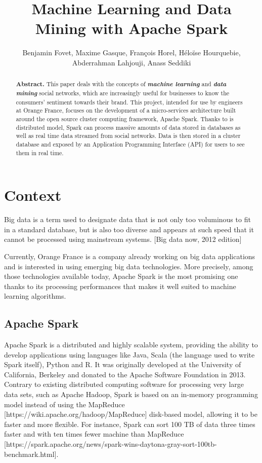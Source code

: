 \documentclass[11pt]{article}
\title{\textbf{Machine Learning and Data Mining with Apache Spark}}
\author{Benjamin Fovet, Maxime Gasque, François Horel, Héloïse Hourquebie, Abderrahman Lahjouji, Anass Seddiki}
\affil{\texttt{\{bfovet, mgasque, fhorel, hhourquebie, alahjouji, aseddiki\} @enseirb-matmeca.fr}}
\date{}
\begin{document}
\maketitle

\begin{abstract}
\textbf{Abstract.} This paper deals with the concepts of \textbf{\textit{machine learning}} and \textbf{\textit{data mining}} social networks, which are increasingly useful for businesses to know the consumers' sentiment towards their brand. This project, intended for use by engineers at Orange France, focuses on the development of a micro-services architecture built around the open source cluster computing framework, Apache Spark. Thanks to is distributed model, Spark can process massive amounts of data stored in databases as well as real time data streamed from social networks. Data is then stored in a cluster database and exposed by an Application Programming Interface (API) for users to see them in real time.
\end{abstract}

\section{Context}
Big data is a term used to designate data that is not only too voluminous to fit in a standard database, but is also too diverse and appears at such speed that it cannot be processed using mainstream systems. [Big data now, 2012 edition]
\vskip 9pt

Currently, Orange France is a company already working on big data applications and is interested in using emerging big data technologies. More precisely, among those technologies available today, Apache Spark is the most promising one thanks to its processing performances that makes it well suited to machine learning algorithms.

\subsection{Apache Spark}
\label{apache spark}
Apache Spark is a distributed and highly scalable system, providing the ability to develop applications using languages like Java, Scala (the language used to write Spark itself), Python and R. It was originally developed at the University of California, Berkeley and donated to the Apache Software Foundation in 2013.
Contrary to existing distributed computing software for processing very large data sets, such as Apache Hadoop, Spark is based on an in-memory programming model instead of using the MapReduce [https://wiki.apache.org/hadoop/MapReduce] disk-based model, allowing it to be faster and more flexible. For instance, Spark can sort 100 TB of data three times faster and with ten times fewer machine than MapReduce [https://spark.apache.org/news/spark-wins-daytona-gray-sort-100tb-benchmark.html].
\end{document}
